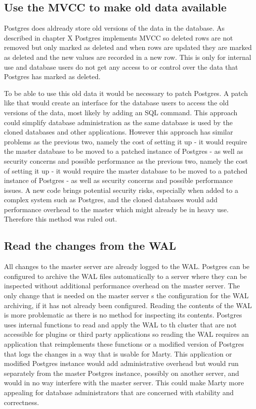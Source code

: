 \documentclass[a4paper,12pt,twoside,BCOR=10mm]{scrbook}
\begin{document}
\subsection{Use the MVCC to make old data available}
Postgres does aldready store old versions of the data in the database. As described in chapter X Postgres implements MVCC so deleted rows are not removed but only marked as deleted and when rows are updated they are marked as deleted and the new values are recorded in a new row. This is only for internal use and database users do not get any access to or control over the data that Postgres has marked as deleted.

To be able to use this old data it would be necessary to patch Postgres. A patch like that would create an interface for the database users to access the old versions of the data, most likely by adding an SQL command. This approach could simplify database administration as the same database is used by the cloned databases and other applications. However this approach has similar problems as the previous two, namely the cost of setting it up - it would require the master database to be moved to a patched instance of Postgres - as well as security concerns and possible performance as the previous two, namely the cost of setting it up - it would require the master database to be moved to a patched instance of Postgres - as well as security concerns and possible performance issues. A new code brings potential security risks, especially when added to a complex system such as Postgres, and the cloned databases would add performance overhead to the master which might already be in heavy use. Therefore this method 
was ruled out.


\subsection{Read the changes from the WAL}
All changes to the master server are already logged to the WAL. Postgres can be configured to archive the WAL files automatically to a server where they can be inspected without additional performance overhead on the master server. The only change that is needed on the master server s the configuration for the WAL archiving, if it has not already been configured. Reading the contents of the WAL is more problematic as there is no method for inspecting its contents. Postgres uses internal functions to read and apply the WAL to th cluster that are not accessible for plugins or third party applications so reading the WAL requires an application that reimplements these functions or a modified version of Postgres that logs the changes in a way that is usable for Marty. This application or modified Postgres instance would add administrative overhead but would run separately from the master Postgres instance, possibly on another server, and would in no way interfere with the master server. This could make Marty more 
appealing for database administrators that are concerned with stability and correctness.
\end{document}
